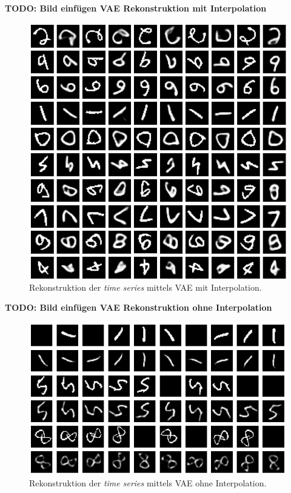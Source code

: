 \documentclass[12pt]{article}
\begin{document}
	\textbf{TODO: Bild einfügen VAE Rekonstruktion mit Interpolation}
	\begin{figure}[!htbp]
		\centering
		\includegraphics[scale=0.8]{interpolation}
		\caption{Rekonstruktion der \emph{time series} mittels VAE mit Interpolation.}
	\end{figure}
	\textbf{TODO: Bild einfügen VAE Rekonstruktion ohne Interpolation}
	\begin{figure}[!htbp]
		\centering
		\includegraphics[scale=0.8]{whole_sequence_mnist}
		\caption{Rekonstruktion der \emph{time series} mittels VAE ohne Interpolation.}
	\end{figure}
\end{document}
